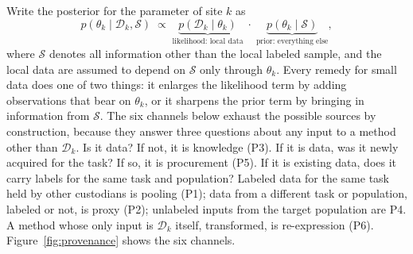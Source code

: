 \documentclass[acmsmall,screen,review]{acmart}
\theoremstyle{acmdefinition}
\begin{document}
Write the posterior for the parameter of site $k$ as
\begin{equation}\label{eq:posterior}
p(\theta_k\mid\mathcal{D}_k,\mathcal{S}) \;\propto\; \underbrace{p(\mathcal{D}_k\mid\theta_k)}_{\text{likelihood: local data}} \;\cdot\; \underbrace{p(\theta_k\mid\mathcal{S})}_{\text{prior: everything else}},
\end{equation}
where $\mathcal{S}$ denotes all information other than the local labeled sample, and the local data are assumed to depend on $\mathcal{S}$ only through $\theta_k$. Every remedy for small data does one of two things: it enlarges the likelihood term by adding observations that bear on $\theta_k$, or it sharpens the prior term by bringing in information from $\mathcal{S}$. The six channels below exhaust the possible sources by construction, because they answer three questions about any input to a method other than $\mathcal{D}_k$. Is it data? If not, it is knowledge (P3). If it is data, was it newly acquired for the task? If so, it is procurement (P5). If it is existing data, does it carry labels for the same task and population? Labeled data for the same task held by other custodians is pooling (P1); data from a different task or population, labeled or not, is proxy (P2); unlabeled inputs from the target population are P4. A method whose only input is $\mathcal{D}_k$ itself, transformed, is re-expression (P6). Figure~\ref{fig:provenance} shows the six channels.
\end{document}
